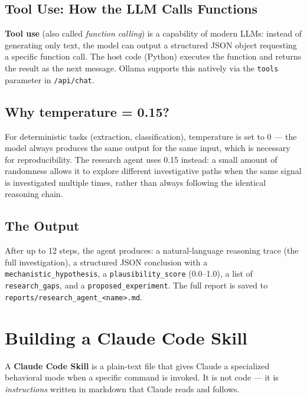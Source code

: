 \documentclass[11pt,a4paper]{article}
\begin{document}
\subsection{Tool Use: How the LLM Calls Functions}

\textbf{Tool use} (also called \textit{function calling}) is a capability of modern
LLMs: instead of generating only text, the model can output a structured JSON
object requesting a specific function call. The host code (Python) executes the
function and returns the result as the next message. Ollama supports this natively
via the \texttt{tools} parameter in \texttt{/api/chat}.

\subsection{Why temperature = 0.15?}

For deterministic tasks (extraction, classification), temperature is set to 0 ---
the model always produces the same output for the same input, which is necessary
for reproducibility. The research agent uses 0.15 instead: a small amount of
randomness allows it to explore different investigative paths when the same
signal is investigated multiple times, rather than always following the
identical reasoning chain.

\subsection{The Output}

After up to 12 steps, the agent produces:
a natural-language reasoning trace (the full investigation),
a structured JSON conclusion with a \texttt{mechanistic\_hypothesis},
a \texttt{plausibility\_score} (0.0--1.0),
a list of \texttt{research\_gaps}, and a \texttt{proposed\_experiment}.
The full report is saved to \texttt{reports/research\_agent\_<name>.md}.

\section{Building a Claude Code Skill}

A \textbf{Claude Code Skill} is a plain-text file that gives Claude a specialized
behavioral mode when a specific command is invoked. It is not code --- it is
\textit{instructions} written in markdown that Claude reads and follows.
\end{document}
